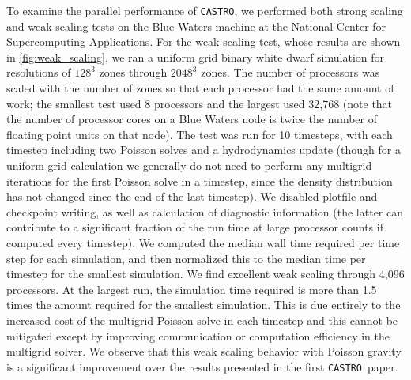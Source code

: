 \documentclass[iop]{../emulateapj}
\newcommand{\castro}{\texttt{CASTRO}}
\begin{document}
To examine the parallel performance of \castro, we performed both strong scaling 
and weak scaling tests on the Blue Waters machine at the National Center for 
Supercomputing Applications. For the weak scaling test, whose results are 
shown in \autoref{fig:weak_scaling}, we ran a uniform grid binary white 
dwarf simulation for resolutions of $128^3$ zones through $2048^3$ zones. The 
number of processors was scaled with the number of zones so that each processor 
had the same amount of work; the smallest test used 8 processors and the largest 
used 32,768 (note that the number of processor cores on a Blue Waters node is twice 
the number of floating point units on that node). The test was run for 10 timesteps,
with each timestep including two Poisson solves and a hydrodynamics update (though 
for a uniform grid calculation we generally do not need to perform any multigrid 
iterations for the first Poisson solve in a timestep, since the density distribution 
has not changed since the end of the last timestep). We disabled plotfile and 
checkpoint writing, as well as calculation of diagnostic information (the latter 
can contribute to a significant fraction of the run time at large processor 
counts if computed every timestep). We computed the median wall time required per 
time step for each simulation, and then normalized this to the median time per 
timestep for the smallest simulation. We find excellent weak scaling through 
4,096 processors. At the largest run, the simulation time required is 
more than 1.5 times the amount required for the smallest simulation. 
This is due entirely to the increased cost of the multigrid Poisson solve 
in each timestep and this cannot be mitigated except by improving 
communication or computation efficiency in the multigrid solver. We observe 
that this weak scaling behavior with Poisson gravity is a significant 
improvement over the results presented in the first \castro\ paper.
\end{document}
